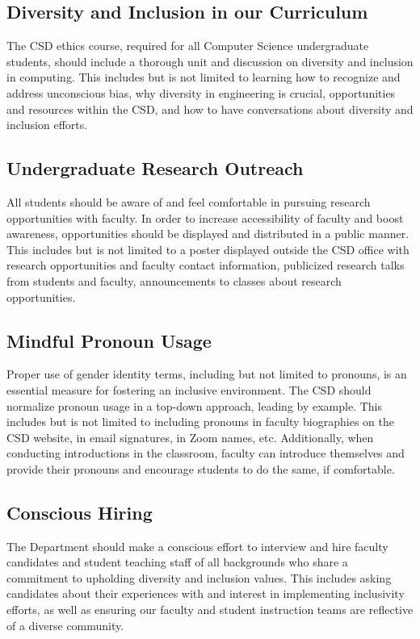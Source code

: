 \documentclass{article}
\begin{document}
\subsection{Diversity and Inclusion in our Curriculum} 
The CSD ethics course, required for all Computer Science undergraduate students, 
should include a thorough unit and discussion on diversity and inclusion in computing. 
This includes but is not limited to learning how to recognize and address unconscious bias, why diversity in 
engineering is crucial, opportunities and resources within the CSD, and how to have conversations about diversity 
and inclusion efforts.

\subsection{Undergraduate Research Outreach} 
All students should be aware of and feel comfortable in pursuing 
research opportunities with faculty. In order to increase accessibility of faculty and boost awareness, 
opportunities should be displayed and distributed in a public manner. This includes but is not limited to a poster 
displayed outside the CSD office with research opportunities and faculty contact information, publicized research 
talks from students and faculty, announcements to classes about research opportunities.

\subsection{Mindful Pronoun Usage} 
Proper use of gender identity terms, including but not limited to pronouns, 
is an essential measure for fostering an inclusive environment. The CSD should normalize pronoun usage in a 
top-down approach, leading by example. This includes but is not limited to including pronouns in faculty biographies 
on the CSD website, in email signatures, in Zoom names, etc. Additionally, when conducting introductions in the 
classroom, faculty can introduce themselves and provide their pronouns and encourage students to do the same, if 
comfortable.

\subsection{Conscious Hiring} 
The Department should make a conscious effort to interview and hire faculty candidates and 
student teaching staff of all backgrounds who share a commitment to upholding diversity and inclusion values. 
This includes asking candidates about their experiences with and interest in implementing inclusivity efforts, as well 
as ensuring our faculty and student instruction teams are reflective of a diverse community.
\end{document}
